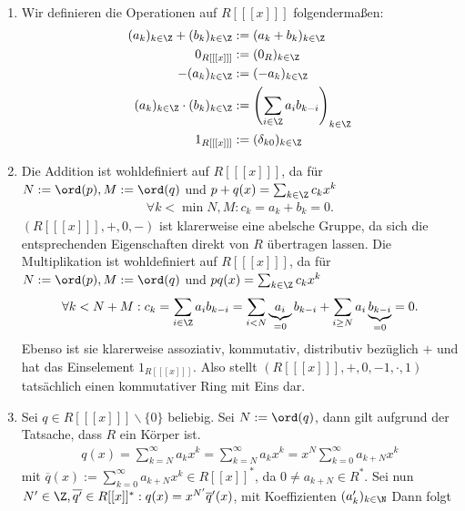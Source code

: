 \begin{solution}
\leavevmode \\
\begin{enumerate}
  \item Wir definieren die Operationen auf $R[[[x]]]$ folgendermaßen:
  \begin{align*}
    (a_k)_{k \in \Z} + (b_k)_{k \in \Z} &:= (a_k + b_k)_{k \in \Z} \\
    0_{R[[[x]]]} &:= (0_R)_{k \in \Z} \\
    -(a_k)_{k \in \Z} &:= (-a_k)_{k \in \Z} \\
    (a_k)_{k \in \Z} \cdot (b_k)_{k \in \Z} &:= \left(\sum_{i \in \Z}a_ib_{k-i}\right)_{k \in \Z} \\
    1_{R[[[x]]]} &:= (\delta_{k0})_{k \in \Z}
  \end{align*}
  \item Die Addition ist wohldefiniert auf $R[[[x]]]$, da für $N := \ord(p), M := \ord(q)$
  und $p+q(x) = \sum_{k \in \Z}c_kx^k$
  \begin{align*}
    \forall k < \min{N,M}: c_k = a_k + b_k = 0.
  \end{align*}
  $(R[[[x]]],+,0,-)$ ist klarerweise eine abelsche Gruppe, da sich die
  entsprechenden Eigenschaften direkt von $R$ übertragen lassen.
  Die Multiplikation ist wohldefiniert auf $R[[[x]]]$, da für $N := \ord(p), M := \ord(q)$
  und $pq(x) = \sum_{k \in \Z}c_kx^k$
  \begin{align*}
    \forall k < N + M: c_k = \sum_{i \in \Z}a_ib_{k-i}
    = \sum_{i < N}\underbrace{a_i}_{=0}b_{k-i} + \sum_{i \geq N}a_i\underbrace{b_{k-i}}_{=0} = 0.
  \end{align*}
  Ebenso ist sie klarerweise assoziativ, kommutativ, distributiv bezüglich $+$
  und hat das Einselement $1_{R[[[x]]]}$.
  Also stellt $(R[[[x]]],+,0,-1,\cdot,1)$ tatsächlich einen kommutativer Ring mit Eins dar.
  \item Sei $q \in R[[[x]]]\backslash \{0\}$ beliebig. Sei $N := \ord(q)$, dann gilt
  aufgrund der Tatsache, dass $R$ ein Körper ist.
  \begin{align*}
    q(x) = \sum_{k = N}^{\infty}a_kx^k = \sum_{k = N}^{\infty}a_kx^k
    = x^{N}\sum_{k = 0}^{\infty}a_{k+N}x^k
  \end{align*}
  mit $\overline{q}(x) := \sum_{k = 0}^{\infty}a_{k+N}x^k \in R[[x]]^*$, da $0 \neq a_{k+N} \in R^*$.
  Sei nun $N^{\prime} \in \Z, \overline{q^{\prime}} \in R[[x]]^*: q(x) = x^{N^{\prime}}\overline{q}^{\prime}(x)$,
  mit Koeffizienten $(a_k^{\prime})_{k \in \N}$
  Dann folgt

\end{enumerate}
\end{solution}
